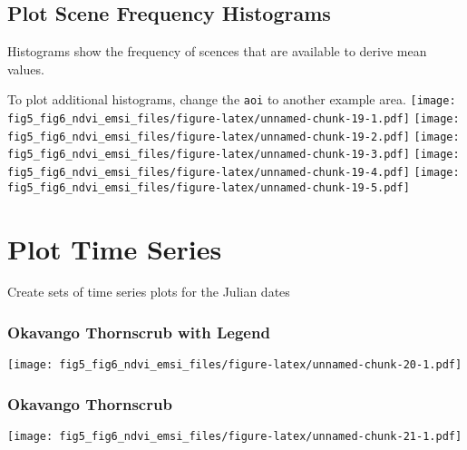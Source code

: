 \documentclass[
]{article}
\begin{document}
\hypertarget{plot-scene-frequency-histograms}{%
\subsection{Plot Scene Frequency
Histograms}\label{plot-scene-frequency-histograms}}

Histograms show the frequency of scences that are available to derive
mean values.

To plot additional histograms, change the \texttt{aoi} to another
example area.
\texttt{[image: fig5\_fig6\_ndvi\_emsi\_files/figure-latex/unnamed-chunk-19-1.pdf]}
\texttt{[image: fig5\_fig6\_ndvi\_emsi\_files/figure-latex/unnamed-chunk-19-2.pdf]}
\texttt{[image: fig5\_fig6\_ndvi\_emsi\_files/figure-latex/unnamed-chunk-19-3.pdf]}
\texttt{[image: fig5\_fig6\_ndvi\_emsi\_files/figure-latex/unnamed-chunk-19-4.pdf]}
\texttt{[image: fig5\_fig6\_ndvi\_emsi\_files/figure-latex/unnamed-chunk-19-5.pdf]}

\hypertarget{plot-time-series}{%
\section{Plot Time Series}\label{plot-time-series}}

Create sets of time series plots for the Julian dates

\hypertarget{okavango-thornscrub-with-legend}{%
\subsubsection{Okavango Thornscrub with
Legend}\label{okavango-thornscrub-with-legend}}

\texttt{[image: fig5\_fig6\_ndvi\_emsi\_files/figure-latex/unnamed-chunk-20-1.pdf]}

\hypertarget{htmlwidget-2b073ffb3961375f86a4}{}
\begin{plotly}

\end{plotly}

\hypertarget{okavango-thornscrub}{%
\subsubsection{Okavango Thornscrub}\label{okavango-thornscrub}}

\texttt{[image: fig5\_fig6\_ndvi\_emsi\_files/figure-latex/unnamed-chunk-21-1.pdf]}

\hypertarget{htmlwidget-79ea5715cc276b3cd47a}{}
\begin{plotly}

\end{plotly}
\end{document}
